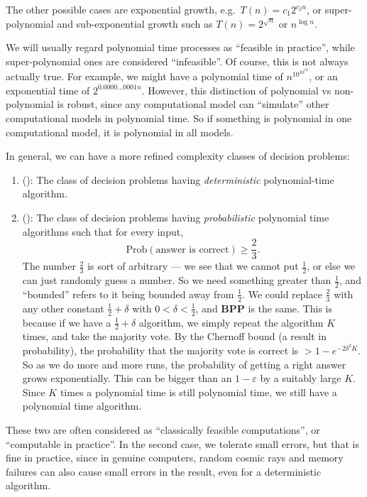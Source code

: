 \documentclass[a4paper]{article}
\begin{document}
The other possible cases are exponential growth, e.g.\ $T(n) = c_1 2^{c_2 n}$, or super-polynomial and sub-exponential growth such as $T(n) = 2^{\sqrt{n}}$ or $n^{\log n}$.

We will usually regard polynomial time processes as ``feasible in practice'', while super-polynomial ones are considered ``infeasible''. Of course, this is not always actually true. For example, we might have a polynomial time of $n^{10^{10^{10}}}$, or an exponential time of $2^{0.0000\ldots0001 n}$. However, this distinction of polynomial vs non-polynomial is robust, since any computational model can ``simulate'' other computational models in polynomial time. So if something is polynomial in one computational model, it is polynomial in all models.

In general, we can have a more refined complexity classes of decision problems:
\begin{enumerate}
  \item {} (): The class of decision problems having \emph{deterministic} polynomial-time algorithm.
  \item {} (): The class of decision problems having \emph{probabilistic} polynomial time algorithms such that for every input,
    \[
      \mathrm{Prob}(\text{answer is correct}) \geq \frac{2}{3}.
    \]
    The number $\frac{2}{3}$ is sort of arbitrary --- we see that we cannot put $\frac{1}{2}$, or else we can just randomly guess a number. So we need something greater than $\frac{1}{2}$, and ``bounded'' refers to it being bounded away from $\frac{1}{2}$. We could replace $\frac{2}{3}$ with any other constant $\frac{1}{2} + \delta$ with $0 < \delta < \frac{1}{2}$, and \textbf{BPP} is the same. This is because if we have a $\frac{1}{2} + \delta$ algorithm, we simply repeat the algorithm $K$ times, and take the majority vote. By the Chernoff bound (a result in probability), the probability that the majority vote is correct is $> 1 - e^{-2 \delta^2 K}$. So as we do more and more runs, the probability of getting a right answer grows exponentially. This can be bigger than an $1 - \varepsilon$ by a suitably large $K$. Since $K$ times a polynomial time is still polynomial time, we still have a polynomial time algorithm.
\end{enumerate}
These two are often considered as ``classically feasible computations'', or ``computable in practice''. In the second case, we tolerate small errors, but that is fine in practice, since in genuine computers, random cosmic rays and memory failures can also cause small errors in the result, even for a deterministic algorithm.
\end{document}

